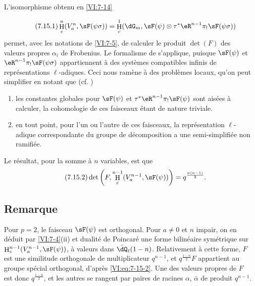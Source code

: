 \documentclass[oneside]{book}
\DeclareMathOperator{\h}{H}
\theoremstyle{sga-source}
\theoremstyle{sga-source-dash}
\theoremstyle{sga-source-dotdash}
\theoremstyle{sga-source-number-note-dash}
\theoremstyle{sga-source-note-number-dotdash}
\theoremstyle{sga-source-example-dotdash}
\theoremstyle{sga-source-inline-number}
\theoremstyle{sga-source-bare-number}
\theoremstyle{sga-source}
\newcommand{\PrintPage}[1]{}\newcommand{\MathPage}[1]{}\newcommand{\PrintCite}[2]{#1}\newcommand{\var}[3]{#1}
\begin{document}
L'isomorphisme obtenu en \ref{VI:7-14} 
\PrintPage{226}
\begin{equation*}\tag{7.15.1}\label{VI:eq:7-15-1}
  \h_c^n(V_a^n,\sF(\psi\sigma)) = \h_c^1(\dG_m,\sF(\psi)\otimes \tau^\ast \eR^{n-1} \pi_! \sF(\psi\sigma)) 
\end{equation*}
permet, avec les notations de \ref{VI:7-5}, de calculer le produit $\det(F)$ 
des valeurs propres $\alpha_i$ de Frobenius. Le formalisme de \cite{de73} 
s'applique, puisque $\sF(\psi)$ et $\eR^{n-1} \pi_! \sF(\psi\sigma)$ 
appartiennent à des systèmes compatibles infinis de représentations 
$\ell$-adiques. Ceci nous ramène à des problèmes locaux, qu'on peut 
simplifier en notant que (cf. \cite[9.5]{de73}) 
\begin{enumerate}[\indent a)]
  \item les constantes globales pour 
    $\sF(\psi)$ et $\tau^\ast \eR^{n-1} \pi_! \sF(\psi)$ sont aisées à 
    calculer, la cohomologie de ces faisceaux étant de nature triviale. 
  \item en tout point, pour l'un ou l'autre de ces faisceaux, la 
    représentation $\ell$-adique correspondante du groupe de décomposition 
    a une semi-simplifiée non ramifiée. 
\end{enumerate}

Le résultat, pour la somme à $n$ variables, est que 
\begin{equation*}\tag{7.15.2}\label{VI:eq:7-15-2}
  \det\left(F,\h_c^{n-1}(V_a^{n-1},\sF(\psi))\right) = q^{\frac{n(n-1)}{2}} \text{.} 
\end{equation*}





\subsection{Remarque}\label{VI:7-16}

Pour $p=2$, le faisceau $\sF(\psi)$ est orthogonal. Pour $a\ne 0$ et $n$ 
impair, on en déduit par \ref{VI:7-4}(ii) et dualité de Poincaré une 
forme bilinéaire symétrique sur $\h_c^{n-1}(V_a^{n-1},\sF(\psi))$, à 
valeurs dans $\bar\dQ_\ell(1-n)$. Relativement à cette forme, $F$ est une 
similitude orthogonale de multiplicateur $q^{n-1}$, et $q^{\frac{1-n}{2}} F$ 
appartient au groupe spécial orthogonal, d'après \eqref{VI:eq:7-15-2}. Une 
des \var{valeurs propres de $F$ est donc $q^{\frac{1-n}{2}}$}{valeurs propres de $F$ est donc $q^{\frac{n-1}{2}}$}{S45-SOL-0951}, et les autres se 
rangent par paires de racines $\alpha$, $\bar\alpha$ de produit $q^{n-1}$. 
\end{document}
